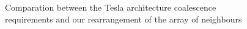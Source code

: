 \begin{itemize}
\begin{figure}[h!tb]
	\label{fig:coalescB}
	\caption{Comparation between the Tesla architecture coalescence requirements and our rearrangement of the array of neighbours}
	\label{fig:Coalescence}
\end{figure}




\end{itemize}










